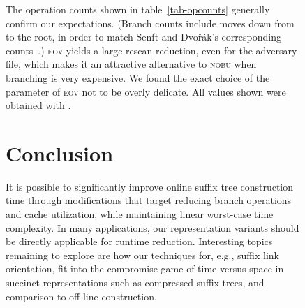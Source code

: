\documentclass{llncs}
\newcommand\nobu{\textsc{nobu}\xspace}
\newcommand\eov{\textsc{eov}\xspace}
\begin{document}
\begin{figure}[t]
The operation counts shown in table~\ref{tab-opcounts} generally confirm our
expectations.  (Branch counts include moves down from  to the
root, in order to match Senft and Dvořák's corresponding
counts~\cite{SenftBranching}.) \eov yields a large rescan reduction, even for the adversary
file, which makes it an attractive alternative to \nobu when branching is very
expensive.  We found the exact choice of the  parameter of \eov not to be
overly delicate. All values shown were obtained with .




\section{Conclusion}\label{sec-concl}

It is possible to significantly improve online suffix tree construction time  
through modifications that target reducing branch operations and cache  
utilization, while maintaining linear worst-case time complexity. In many  
applications, our representation variants should be directly applicable for
runtime reduction. Interesting topics remaining to explore are how our
techniques for, e.g., suffix link orientation, fit into the compromise game of
time versus space in succinct representations such as compressed suffix trees,
and comparison to off-line construction.



\end{figure}
\end{document}

